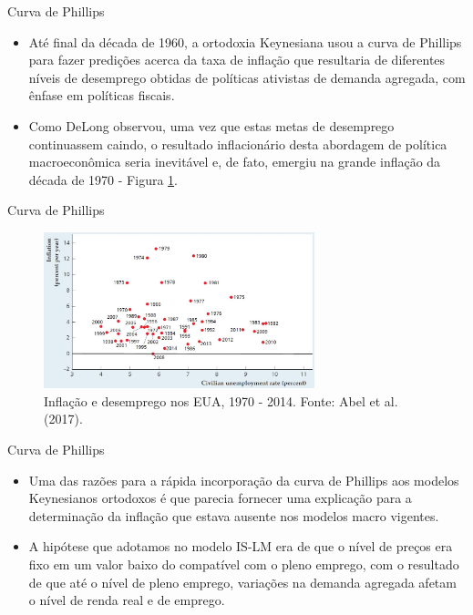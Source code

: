 \documentclass[10pt]{beamer}
\begin{document}
\begin{frame}{Curva de Phillips}
    \begin{itemize}
        \item Até final da década de 1960, a ortodoxia Keynesiana usou a curva de Phillips para fazer predições acerca da taxa de inflação que resultaria de diferentes níveis de desemprego obtidas de políticas ativistas de demanda agregada, com ênfase em políticas fiscais.
        \bigskip
        \item Como DeLong observou, uma vez que estas metas de desemprego continuassem caindo, o resultado inflacionário desta abordagem de política macroeconômica seria inevitável e, de fato, emergiu na grande inflação da década de 1970 - Figura \ref{fig14}.
    \end{itemize}
\end{frame}

\begin{frame}{Curva de Phillips}
    \begin{figure}
        \centering
        \includegraphics[width=0.7\textwidth]{./figures/aula8_fig9.JPG}
        \caption{Inflação e desemprego nos EUA, 1970 - 2014. Fonte: Abel et al. (2017).}
        \label{fig14}
    \end{figure}
\end{frame}

\begin{frame}{Curva de Phillips}
    \begin{itemize}
        \item Uma das razões para a rápida incorporação da curva de Phillips aos modelos Keynesianos ortodoxos é que parecia fornecer uma explicação para a determinação da inflação que estava ausente nos modelos macro vigentes.
        \bigskip
        \item A hipótese que adotamos no modelo IS-LM era de que o nível de preços era fixo em um valor baixo do compatível com o pleno emprego, com o resultado de que até o nível de pleno emprego, variações na demanda agregada afetam o nível de renda real e de emprego.
    \end{itemize}
\end{frame}
\end{document}
